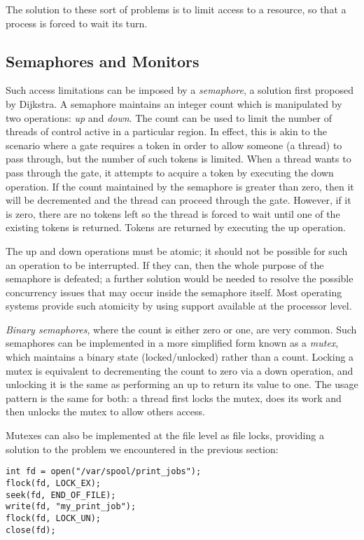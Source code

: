 The solution to these sort of problems is to limit access to a
resource, so that a process is forced to wait its turn.

\subsection{Semaphores and Monitors}
\label{semaphores}

Such access limitations can be imposed by a \emph{semaphore}, a
solution first proposed by Dijkstra\cite{semaphore}.  A semaphore
maintains an integer count which is manipulated by two operations:
\emph{up} and \emph{down}.  The count can be used to limit the number
of threads of control active in a particular region.  In effect, this
is akin to the scenario where a gate requires a token in order to
allow someone (a thread) to pass through, but the number of such
tokens is limited.  When a thread wants to pass through the gate, it
attempts to acquire a token by executing the down operation.  If the
count maintained by the semaphore is greater than zero, then it will
be decremented and the thread can proceed through the gate.  However,
if it is zero, there are no tokens left so the thread is forced to
wait until one of the existing tokens is returned.  Tokens are
returned by executing the up operation.

The up and down operations must be atomic; it should not be possible
for such an operation to be interrupted.  If they can, then the whole
purpose of the semaphore is defeated; a further solution would be
needed to resolve the possible concurrency issues that may occur
inside the semaphore itself.  Most operating systems provide such
atomicity by using support available at the processor level.

\emph{Binary semaphores}, where the count is either zero or one, are
very common.  Such semaphores can be implemented in a more simplified
form known as a \emph{mutex}, which maintains a binary state
(locked/unlocked) rather than a count.  Locking a mutex is equivalent
to decrementing the count to zero via a down operation, and unlocking
it is the same as performing an up to return its value to one.  The
usage pattern is the same for both: a thread first locks the mutex,
does its work and then unlocks the mutex to allow others access.

Mutexes can also be implemented at the file level as file locks,
providing a solution to the problem we encountered in the previous
section:

\begin{verbatim}
int fd = open("/var/spool/print_jobs");
flock(fd, LOCK_EX);
seek(fd, END_OF_FILE);
write(fd, "my_print_job");
flock(fd, LOCK_UN);
close(fd);
\end{verbatim}

